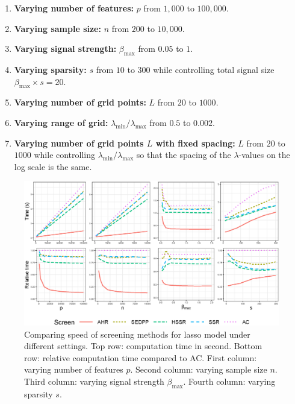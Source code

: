 \documentclass[]{interact}
\theoremstyle{plain}%
\theoremstyle{definition}
\theoremstyle{remark}
\begin{document}
\begin{enumerate}
    \item \textbf{Varying number of features:} $p$ from $1,000$ to $100,000$.
    \item \textbf{Varying sample size:} $n$ from $200$ to $10,000$.
    \item \textbf{Varying signal strength:} $\beta_{\max}$ from $0.05$ to $1$.
    \item \textbf{Varying sparsity:} $s$ from $10$ to $300$ while controlling total signal size $\beta_{\max}\times s=20$.
    \item \textbf{Varying number of grid points:}  $L$ from $20$ to $1000$.
    \item \textbf{Varying range of grid:}  $\lambda_{\min}/\lambda_{\max}$ from $0.5$ to $0.002$.
    \item \textbf{Varying number of grid points $L$ with fixed spacing:} $L$ from $20$ to $1000$ while controlling $\lambda_{\min}/\lambda_{\max}$ so that the spacing of the $\lambda$-values on the log scale is the same.
\end{enumerate}

\begin{figure}[h]
    \centering
    \includegraphics[width=\textwidth]{511.eps}    \caption{Comparing speed of screening methods for lasso model under different settings. Top row: computation time in second. Bottom row: relative computation time compared to AC. First column: varying number of features $p$. Second column: varying sample size $n$. Third column: varying signal strength $\beta_{\max}$. Fourth column: varying sparsity $s$.}
    \label{fig:5.1.1a}
\end{figure}
\end{document}
